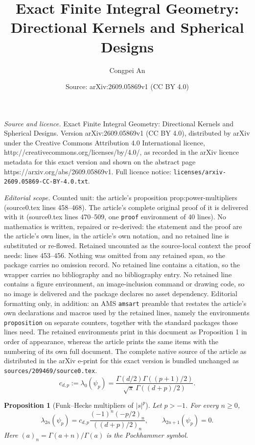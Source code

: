 \documentclass[10pt,a4paper]{amsart}
\title{Exact Finite Integral Geometry: Directional Kernels and Spherical Designs}
\author{Congpei An}
\date{Source: arXiv:2609.05869v1 (CC BY 4.0)}
\newtheorem{proposition}{Proposition}
\begin{document}
\maketitle

\noindent\emph{Source and licence.} Exact Finite Integral Geometry: Directional Kernels and Spherical Designs. Version arXiv:2609.05869v1 (CC BY 4.0), distributed by arXiv under the Creative Commons Attribution 4.0 International licence, http://creativecommons.org/licenses/by/4.0/, as recorded in the arXiv licence metadata for this exact version and shown on the abstract page https://arxiv.org/abs/2609.05869v1. Full licence notice: \texttt{licenses/arxiv-2609.05869-CC-BY-4.0.txt}.\par\smallskip

\noindent\textit{Editorial scope.} Counted unit: the article's proposition prop:power-multipliers (source0.tex lines 458--468). The article's complete original proof of it is delivered with it (source0.tex lines 470--509, one \texttt{proof} environment of 40 lines). No mathematics is written, repaired or re-derived: the statement and the proof are the article's own lines, in the article's own notation, and no retained line is substituted or re-flowed.  Retained uncounted as the source-local context the proof needs: lines 453--456.  Nothing was omitted from any retained span, so the package carries no omission record.  No retained line contains a citation, so the wrapper carries no bibliography and no bibliography entry.  No retained line contains a figure environment, an image-inclusion command or drawing code, so no image is delivered and the package declares no asset dependency.  Editorial formatting only, in addition: an AMS \texttt{amsart} preamble that restates the article's own declarations and macros used by the retained lines, namely the environments \texttt{proposition} on separate counters, together with the standard packages those lines need.  The retained environments print in this document as Proposition 1 in order of appearance, whereas the article prints the same items with the numbering of its own full document.  The complete native source of the article as distributed in the arXiv e-print for this exact version is bundled unchanged as \texttt{sources/209469/source0.tex}.
\begin{equation}\label{eq:cdp}
 c_{d,p}:=\lambda_0(\psi_p)
 =\frac{\Gamma(d/2)\Gamma((p+1)/2)}{\sqrt\pi\,\Gamma((d+p)/2)}.
\end{equation}

\begin{proposition}[Funk--Hecke multipliers of $|s|^p$]\label{prop:power-multipliers}
Let $p>-1$.  For every $n\ge0$,
\begin{equation}\label{eq:power-multipliers}
 \lambda_{2n}(\psi_p)
 =c_{d,p}
 \frac{(-1)^n(-p/2)_n}{((d+p)/2)_n},
 \qquad
 \lambda_{2n+1}(\psi_p)=0.
\end{equation}
Here $(a)_n=\Gamma(a+n)/\Gamma(a)$ is the Pochhammer symbol.
\end{proposition}
\end{document}
